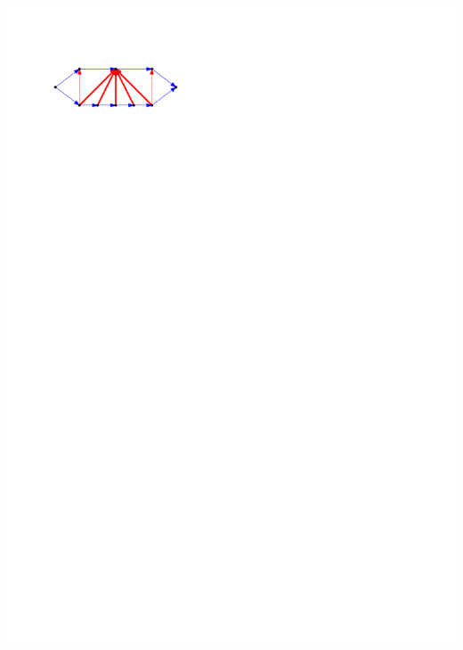 \documentclass[a4paper]{article}
\begin{document}
\includegraphics[]{./unifiedAlgo/img/topfanExample.pdf}
\clearpage%
\end{document}
